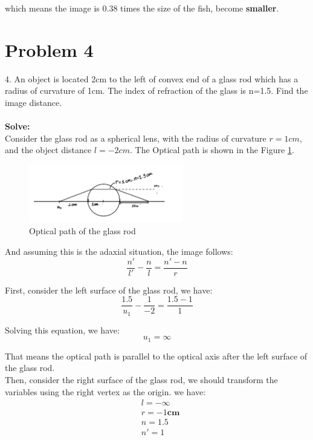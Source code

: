 \documentclass{article}
\begin{document}
which means the image is $\mathbf{0.38}$ times the size of the fish, become \textbf{smaller}.





\section{Problem 4}
4. An object is located 2cm to the left of convex end of a glass rod which has a radius of curvature of 1cm. The index of refraction of the glass is n=1.5. Find the image distance.\\\\
\textbf{Solve:}\\

Consider the glass rod as  a spherical lens, with the radius of curvature $r = 1cm$, and the object distance $l = -2cm$. The Optical path is shown in the Figure \ref{fig:hw2e_2}.
\begin{figure}[H]
    \centering
    \includegraphics[width=0.6\textwidth]{./image/hw2/hw2e_2.jpeg}
    \caption{Optical path of the glass rod}
    \label{fig:hw2e_2}
\end{figure}

And assuming this is the adaxial situation, the image follows:
\begin{equation}
    \frac{n'}{l'} - \frac{n}{l} = \frac{n'-n}{r}
\end{equation}

First, consider the left surface of the glass rod, we have:
\begin{equation}
    \frac{1.5}{u_1} - \frac{1}{-2} = \frac{1.5-1}{1}
\end{equation}

Solving this equation, we have:
\begin{equation}
    \boxed{
        u_1 = \infty
    }
\end{equation}

That means the optical path is parallel to the optical axis after the left surface of the glass rod.\\

Then, consider the right surface of the glass rod, we should transform the variables using the right vertex as the origin. we have:
\begin{align}
     & l =  - \infty      \\
     & r =  -1\mathbf{cm} \\
     & n =  1.5           \\
     & n'=  1             \\
\end{align}
\end{document}
